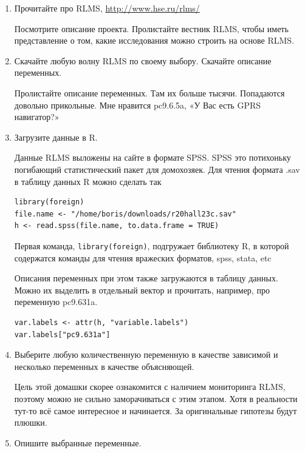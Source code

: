 \documentclass[12pt, a4paper]{article}
\begin{document}
\begin{enumerate}
\item Прочитайте про RLMS, \url{http://www.hse.ru/rlms/}

Посмотрите описание проекта. Пролистайте вестник RLMS, чтобы иметь представление о том, какие исследования можно строить на основе RLMS.

\item Скачайте любую волну RLMS по своему выбору. Скачайте описание переменных.

Пролистайте описание переменных. Там их больше тысячи. Попадаются довольно прикольные. Мне нравится pc9.6.5a, «У Вас есть GPRS навигатор?»

\item Загрузите данные в R.

Данные RLMS выложены на сайте в формате SPSS. SPSS это потихоньку погибающий статистический пакет для домохозяек. Для чтения формата .sav в таблицу данных R можно сделать так
\begin{verbatim}
library(foreign)
file.name <- "/home/boris/downloads/r20hall23c.sav"
h <- read.spss(file.name, to.data.frame = TRUE)
\end{verbatim}

Первая команда, \verb|library(foreign)|, подгружает библиотеку R, в которой содержатся команды для чтения вражеских форматов, spss, stata, etc

Описания переменных при этом также загружаются в таблицу данных.
Можно их выделить в отдельный вектор и прочитать, например, про переменную pc9.631a.
\begin{verbatim}
var.labels <- attr(h, "variable.labels")
var.labels["pc9.631a"]
\end{verbatim}

\item Выберите любую количественную переменную в качестве зависимой и несколько переменных в качестве объясняющей.

Цель этой домашки скорее ознакомится с наличием мониторинга RLMS, поэтому можно не сильно заморачиваться с этим этапом. Хотя в реальности тут-то всё самое интересное и начинается. За оригинальные гипотезы будут плюшки.

\item Опишите выбранные переменные.


\end{enumerate}
\end{document}
